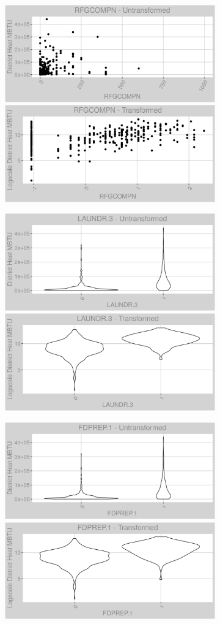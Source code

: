 \FloatBarrier
\newpage
\begin{figure}
\centering
\begin{subfigure}{1\textwidth}
\centering
\includegraphics[width=.49\textwidth, height=0.3\textheight]{Images/district_heat_var_original_15.png}
\includegraphics[width=.49\textwidth, height=0.3\textheight]{Images/district_heat_var_transformed_15.png}
\end{subfigure}
\begin{subfigure}{1\textwidth}
\centering
\includegraphics[width=.49\textwidth, height=0.3\textheight]{Images/district_heat_var_original_16.png}
\includegraphics[width=.49\textwidth, height=0.3\textheight]{Images/district_heat_var_transformed_16.png}
\end{subfigure}
\begin{subfigure}{1\textwidth}
\centering
\includegraphics[width=.49\textwidth, height=0.3\textheight]{Images/district_heat_var_original_17.png}
\includegraphics[width=.49\textwidth, height=0.3\textheight]{Images/district_heat_var_transformed_17.png}
\end{subfigure}
\end{figure}
